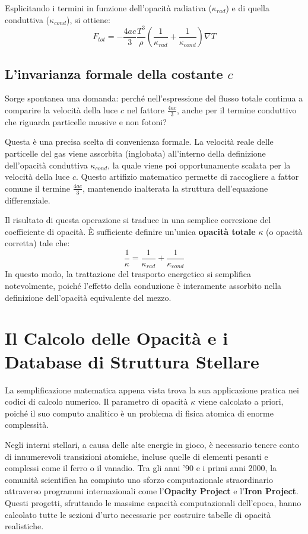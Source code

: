 Esplicitando i termini in funzione dell'opacità radiativa ($\kappa_{rad}$) e di quella conduttiva ($\kappa_{cond}$), si ottiene:
\begin{equation}
F_{tot} = - \frac{4ac}{3} \frac{T^3}{\rho} \left( \frac{1}{\kappa_{rad}} + \frac{1}{\kappa_{cond}} \right) \nabla T
\end{equation}

\subsection{L'invarianza formale della costante $c$}
Sorge spontanea una domanda: perché nell'espressione del flusso totale continua a comparire la velocità della luce $c$ nel fattore $\frac{4ac}{3}$, anche per il termine conduttivo che riguarda particelle massive e non fotoni?

Questa è una precisa scelta di convenienza formale. La velocità reale delle particelle del gas viene assorbita (inglobata) all'interno della definizione dell'opacità conduttiva $\kappa_{cond}$, la quale viene poi opportunamente scalata per la velocità della luce $c$. Questo artifizio matematico permette di raccogliere a fattor comune il termine $\frac{4ac}{3}$, mantenendo inalterata la struttura dell'equazione differenziale.

Il risultato di questa operazione si traduce in una semplice correzione del coefficiente di opacità. È sufficiente definire un'unica \textbf{opacità totale} $\kappa$ (o opacità corretta) tale che:
\begin{equation}
\frac{1}{\kappa} = \frac{1}{\kappa_{rad}} + \frac{1}{\kappa_{cond}}
\end{equation}
In questo modo, la trattazione del trasporto energetico si semplifica notevolmente, poiché l'effetto della conduzione è interamente assorbito nella definizione dell'opacità equivalente del mezzo.

\section{Il Calcolo delle Opacità e i Database di Struttura Stellare}

La semplificazione matematica appena vista trova la sua applicazione pratica nei codici di calcolo numerico. Il parametro di opacità $\kappa$ viene calcolato a priori, poiché il suo computo analitico è un problema di fisica atomica di enorme complessità.

Negli interni stellari, a causa delle alte energie in gioco, è necessario tenere conto di innumerevoli transizioni atomiche, incluse quelle di elementi pesanti e complessi come il ferro o il vanadio. Tra gli anni '90 e i primi anni 2000, la comunità scientifica ha compiuto uno sforzo computazionale straordinario attraverso programmi internazionali come l'\textbf{Opacity Project} e l'\textbf{Iron Project}. Questi progetti, sfruttando le massime capacità computazionali dell'epoca, hanno calcolato tutte le sezioni d'urto necessarie per costruire tabelle di opacità realistiche.

